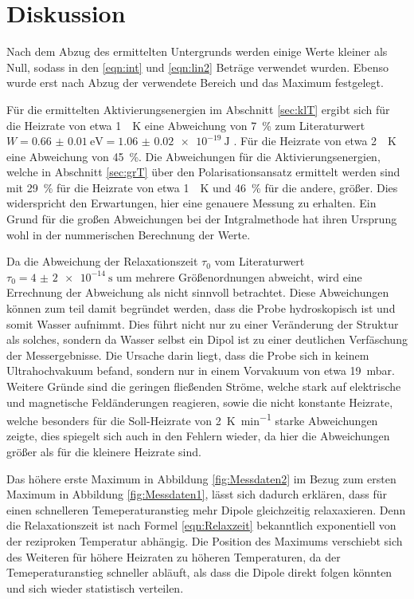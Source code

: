 \section{Diskussion}
\label{sec:Diskussion}
Nach dem Abzug des ermittelten Untergrunds werden einige Werte kleiner als Null, sodass in den \eqref{eqn:int} und \eqref{eqn:lin2} Beträge
verwendet wurden. Ebenso wurde erst nach Abzug der verwendete Bereich und das Maximum festgelegt.

Für die ermittelten Aktivierungsenergien im Abschnitt \ref{sec:klT} ergibt sich für die Heizrate von etwa \SI{1}{\per\kelvin} eine 
Abweichung von \SI{7}{\percent} zum Literaturwert $W=\SI{0.66(1)}{\electronvolt} = \SI{1.06(2)e-19}{\joule}$ \cite{quelle}.
Für die Heizrate von  etwa \SI{2}{\per\kelvin} eine Abweichung von \SI{45}{\percent}. 
Die Abweichungen für die Aktivierungsenergien, welche in Abschnitt \ref{sec:grT} über den Polarisationsansatz ermittelt werden sind mit
\SI{29}{\percent} für die Heizrate von etwa \SI{1}{\per\kelvin} und \SI{46}{\percent} für die andere, größer. Dies 
widerspricht den Erwartungen, hier eine genauere Messung zu erhalten. Ein Grund für die großen Abweichungen
bei der Intgralmethode hat ihren Ursprung wohl in der nummerischen Berechnung der Werte.

Da die Abweichung der Relaxationszeit $\tau_0$ vom Literaturwert $\tau_0 = \SI{4(2)e-14}{\second}$ um mehrere Größenordnungen
abweicht, wird eine Errechnung der Abweichung als nicht sinnvoll betrachtet.
Diese Abweichungen können zum teil damit begründet werden, dass die Probe hydroskopisch ist 
und somit Wasser aufnimmt. Dies führt nicht nur zu einer Veränderung der Struktur als solches, sondern da Wasser selbst ein 
Dipol ist zu einer deutlichen Verfäschung der Messergebnisse. Die Ursache darin liegt, dass die Probe sich in keinem 
Ultrahochvakuum befand, sondern nur in einem Vorvakuum von etwa \SI{19}{\milli\bar}. 
Weitere Gründe sind die geringen fließenden Ströme, welche stark auf elektrische und magnetische Feldänderungen reagieren, sowie
die nicht konstante Heizrate, welche besonders für die Soll-Heizrate von \SI{2}{\kelvin\per\minute} starke Abweichungen zeigte, dies 
spiegelt sich auch in den Fehlern wieder, da hier die Abweichungen größer als für die kleinere Heizrate sind.


Das höhere erste Maximum in Abbildung \ref{fig:Messdaten2} im Bezug zum ersten Maximum in Abbildung \ref{fig:Messdaten1}, lässt
sich dadurch erklären, dass für einen schnelleren Temeperaturanstieg mehr Dipole gleichzeitig relaxaxieren. Denn die Relaxationszeit
ist nach Formel \eqref{eqn:Relaxzeit} bekanntlich exponentiell von der reziproken Temperatur abhängig.
Die Position des Maximums verschiebt sich des Weiteren für höhere Heizraten zu höheren Temperaturen, da der Temeperaturanstieg
schneller abläuft, als dass die Dipole direkt folgen könnten und sich wieder statistisch verteilen.

